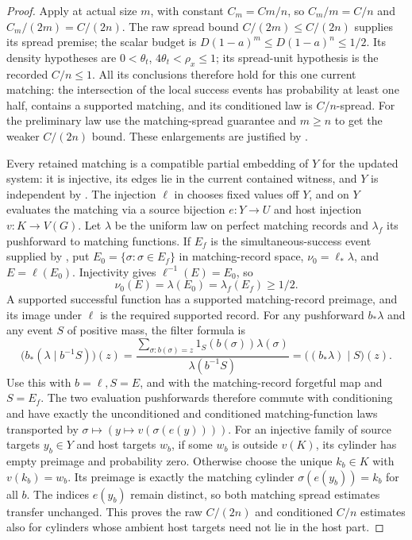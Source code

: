 \begin{proof}
Apply  at actual size $m$, with constant
$C_m=Cm/n$, so $C_m/m=C/n$ and $C_m/(2m)=C/(2n)$.
The raw spread bound $C/(2m)\le C/(2n)$ supplies its spread premise;
the scalar budget is
$D(1-a)^m\le D(1-a)^n\le1/2$.
Its density hypotheses are $0<\theta_t$, $4\theta_t<\rho_x\le1$;
its spread-unit hypothesis is the recorded $C/n\le1$.
All its conclusions therefore hold for this one current matching:
the intersection of the local success events has probability at least
one half, contains a supported matching, and its conditioned law is
$C/n$-spread. For the preliminary law use the matching-spread guarantee
and $m\ge n$ to get the weaker $C/(2n)$ bound. These enlargements are
justified by .

Every retained matching is a compatible partial embedding of $Y$ for
the updated system: it is injective, its edges lie in the current
contained witness, and $Y$ is independent by .
The injection $\ell$ in  chooses
fixed values off $Y$, and on $Y$ evaluates the matching via a source
bijection $e:Y\to U$ and host injection $v:K\to V(G)$.
Let $\lambda$ be the uniform law on perfect matching records and
$\lambda_f$ its pushforward to matching functions. If $E_f$ is the
simultaneous-success event supplied by ,
put $E_0=\{\sigma:\sigma\in E_f\}$ in matching-record space,
$\nu_0=\ell_*\lambda$, and $E=\ell(E_0)$.
Injectivity gives $\ell^{-1}(E)=E_0$, so
\[
 \nu_0(E)=\lambda(E_0)=\lambda_f(E_f)\ge1/2.
\]
A supported successful function has a supported matching-record
preimage, and its image under $\ell$ is the required supported record.
For any pushforward $b_*\lambda$ and any event $S$ of positive mass,
the filter formula is
\[
 \bigl(b_*(\lambda\mid b^{-1}S)\bigr)(z)
 =\frac{\sum_{\sigma:b(\sigma)=z}1_S(b(\sigma))\lambda(\sigma)}
        {\lambda(b^{-1}S)}
 =\bigl((b_*\lambda)\mid S\bigr)(z).
\]
Use this with $b=\ell,S=E$, and with the matching-record forgetful map
and $S=E_f$. The two evaluation pushforwards therefore commute with
conditioning and have exactly the unconditioned and conditioned
matching-function laws transported by
$\sigma\mapsto(y\mapsto v(\sigma(e(y))))$.
For an injective family of source targets $y_b\in Y$ and host targets
$w_b$, if some $w_b$ is outside $v(K)$, its cylinder has empty preimage
and probability zero. Otherwise choose the unique $k_b\in K$ with
$v(k_b)=w_b$. Its preimage is exactly the matching cylinder
$\sigma(e(y_b))=k_b$ for all $b$. The indices $e(y_b)$ remain
distinct, so both matching spread estimates transfer unchanged.
This proves the raw $C/(2n)$ and conditioned $C/n$ estimates also
for cylinders whose ambient host targets need not lie in the host part.


\end{proof}
